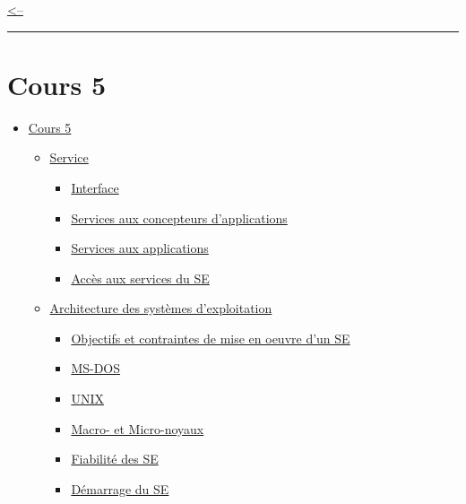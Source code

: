 \href{../README.md}{\textless--}

\begin{center}\rule{0.5\linewidth}{0.5pt}\end{center}

\section{Cours 5}\label{cours-5}

\begin{itemize}
\tightlist
\item
  \hyperref[cours-5]{Cours 5}

  \begin{itemize}
  \tightlist
  \item
    \hyperref[service]{Service}

    \begin{itemize}
    \tightlist
    \item
      \hyperref[interface]{Interface}
    \item
      \hyperref[services-aux-concepteurs-dapplications]{Services aux
      concepteurs d'applications}
    \item
      \hyperref[services-aux-applications]{Services aux applications}
    \item
      \hyperref[accuxe8s-aux-services-du-se]{Accès aux services du SE}
    \end{itemize}
  \item
    \hyperref[architecture-des-systuxe8mes-dexploitation]{Architecture
    des systèmes d'exploitation}

    \begin{itemize}
    \tightlist
    \item
      \hyperref[objectifs-et-contraintes-de-mise-en-oeuvre-dun-se]{Objectifs
      et contraintes de mise en oeuvre d'un SE}
    \item
      \hyperref[ms-dos]{MS-DOS}
    \item
      \hyperref[unix]{UNIX}
    \item
      \hyperref[macro--et-micro-noyaux]{Macro- et Micro-noyaux}
    \item
      \hyperref[fiabilituxe9-des-se]{Fiabilité des SE}
    \item
      \hyperref[duxe9marrage-du-se]{Démarrage du SE}
    \end{itemize}
  \end{itemize}
\end{itemize}

